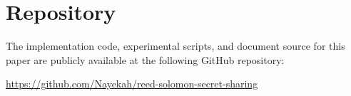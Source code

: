 \section*{Repository}

The implementation code, experimental scripts, and document source for this paper are publicly available at the following GitHub repository:

\begin{center}
\underline{\url{https://github.com/Nayekah/reed-solomon-secret-sharing}}
\end{center}

